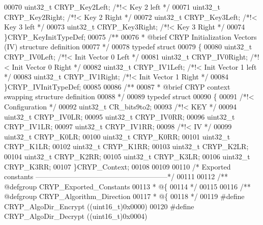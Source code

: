 \begin{DoxyCode}
00070   uint32\_t CRYP_Key2Left;  \textcolor{comment}{/*!< Key 2 left  */}
00071   uint32\_t CRYP_Key2Right; \textcolor{comment}{/*!< Key 2 Right */}
00072   uint32\_t CRYP_Key3Left;  \textcolor{comment}{/*!< Key 3 left  */}
00073   uint32\_t CRYP_Key3Right; \textcolor{comment}{/*!< Key 3 Right */}
00074 \}CRYP\_KeyInitTypeDef;
00075 \textcolor{comment}{/** }
00076 \textcolor{comment}{  * @brief   CRYP Initialization Vectors (IV) structure definition  }
00077 \textcolor{comment}{  */}
00078 \textcolor{keyword}{typedef} \textcolor{keyword}{struct}
00079 \{
00080   uint32\_t CRYP_IV0Left;  \textcolor{comment}{/*!< Init Vector 0 Left  */}
00081   uint32\_t CRYP_IV0Right; \textcolor{comment}{/*!< Init Vector 0 Right */}
00082   uint32\_t CRYP_IV1Left;  \textcolor{comment}{/*!< Init Vector 1 left  */}
00083   uint32\_t CRYP_IV1Right; \textcolor{comment}{/*!< Init Vector 1 Right */}
00084 \}CRYP\_IVInitTypeDef;
00085 
00086 \textcolor{comment}{/** }
00087 \textcolor{comment}{  * @brief  CRYP context swapping structure definition  }
00088 \textcolor{comment}{  */}
00089 \textcolor{keyword}{typedef} \textcolor{keyword}{struct}
00090 \{
00091   \textcolor{comment}{/*!< Configuration */}
00092   uint32\_t CR_bits9to2;
00093   \textcolor{comment}{/*!< KEY */}
00094   uint32\_t CRYP_IV0LR;
00095   uint32\_t CRYP_IV0RR;
00096   uint32\_t CRYP_IV1LR;
00097   uint32\_t CRYP_IV1RR;
00098   \textcolor{comment}{/*!< IV */}
00099   uint32\_t CRYP_K0LR;
00100   uint32\_t CRYP_K0RR;
00101   uint32\_t CRYP_K1LR;
00102   uint32\_t CRYP_K1RR;
00103   uint32\_t CRYP_K2LR;
00104   uint32\_t CRYP_K2RR;
00105   uint32\_t CRYP_K3LR;
00106   uint32\_t CRYP_K3RR;
00107 \}CRYP\_Context;
00108 
00109 
00110 \textcolor{comment}{/* Exported constants --------------------------------------------------------*/}
00111 
00112 \textcolor{comment}{/** @defgroup CRYP\_Exported\_Constants}
00113 \textcolor{comment}{  * @\{}
00114 \textcolor{comment}{  */}
00115 
00116 \textcolor{comment}{/** @defgroup CRYP\_Algorithm\_Direction }
00117 \textcolor{comment}{  * @\{}
00118 \textcolor{comment}{  */}
00119 \textcolor{preprocessor}{#}\textcolor{preprocessor}{define} \textcolor{preprocessor}{CRYP\_AlgoDir\_Encrypt}      \textcolor{preprocessor}{(}\textcolor{preprocessor}{(}\textcolor{preprocessor}{uint16\_t}\textcolor{preprocessor}{)}0x0000\textcolor{preprocessor}{)}
00120 \textcolor{preprocessor}{#}\textcolor{preprocessor}{define} \textcolor{preprocessor}{CRYP\_AlgoDir\_Decrypt}      \textcolor{preprocessor}{(}\textcolor{preprocessor}{(}\textcolor{preprocessor}{uint16\_t}\textcolor{preprocessor}{)}0x0004\textcolor{preprocessor}{)}

\end{DoxyCode}
